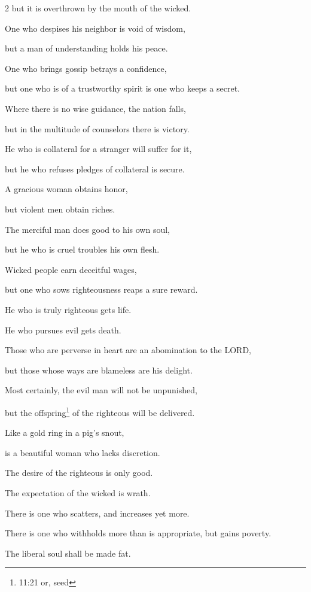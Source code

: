 \begin{multicols}{2}
but it is overthrown by the mouth of the wicked.


\myverse{}One who despises his neighbor is void of wisdom,

but a man of understanding holds his peace.


\myverse{}One who brings gossip betrays a confidence,

but one who is of a trustworthy spirit is one who keeps a secret.


\myverse{}Where there is no wise guidance, the nation falls,

but in the multitude of counselors there is victory.


\myverse{}He who is collateral for a stranger will suffer for it,

but he who refuses pledges of collateral is secure.


\myverse{}A gracious woman obtains honor,

but violent men obtain riches.


\myverse{}The merciful man does good to his own soul,

but he who is cruel troubles his own flesh.


\myverse{}Wicked people earn deceitful wages,

but one who sows righteousness reaps a sure reward.


\myverse{}He who is truly righteous gets life.

He who pursues evil gets death.


\myverse{}Those who are perverse in heart are an abomination to the LORD,

but those whose ways are blameless are his delight.


\myverse{}Most certainly, the evil man will not be unpunished,

but the offspring\footnote{11:21 or, seed} of the righteous will be delivered.


\myverse{}Like a gold ring in a pig’s snout,

is a beautiful woman who lacks discretion.


\myverse{}The desire of the righteous is only good.

The expectation of the wicked is wrath.


\myverse{}There is one who scatters, and increases yet more.

There is one who withholds more than is appropriate, but gains poverty.


\myverse{}The liberal soul shall be made fat.


\end{multicols}
